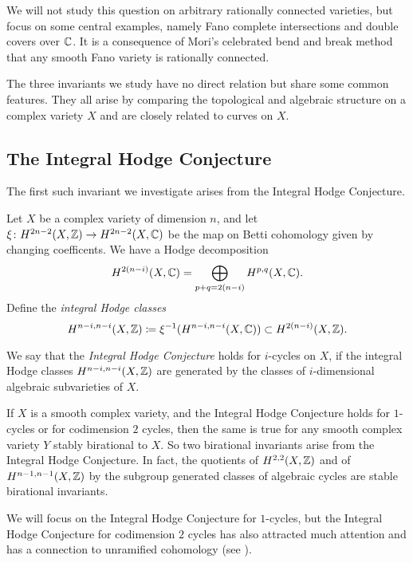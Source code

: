 We will not study this question on arbitrary rationally connected varieties, but focus on some central examples, namely Fano complete intersections and double covers over $\mathbb{C}$. It is a consequence of Mori's celebrated bend and break method that any smooth Fano variety is rationally connected.

The three invariants we study have no direct relation but share some common features. They all arise by comparing the topological and algebraic structure on a complex variety $X$ and are closely related to curves on $X$.

\subsection{The Integral Hodge Conjecture}
The first such invariant we investigate arises from the Integral Hodge Conjecture.

\begin{definition}
	\label{def:ZInvariant}
	Let $X$ be a complex variety of dimension $n$, and let $\xi \colon H^{2n-2}(X,\mathbb{Z}) \to H^{2n-2}(X,\mathbb{C})$ be the map on Betti cohomology given by changing coefficents. We have a Hodge decomposition 
	\[H^{2(n-i)}(X,\mathbb{C}) = \bigoplus_{p+q=2(n-i)}H^{p,q}(X,\mathbb{C}).\]
	Define the \emph{integral Hodge classes} 
	\[H^{n-i,n-i}(X,\mathbb{Z}) \coloneqq \xi^{-1}(H^{n-i,n-i}(X,\mathbb{C})) \subset H^{2(n-i)}(X,\mathbb{Z}).\]
\end{definition}
\begin{definition}
	We say that the \emph{Integral Hodge Conjecture} holds for $i$-cycles on $X$, if the integral Hodge classes $H^{n-i,n-i}(X,\mathbb{Z})$ are generated by the classes of $i$-dimensional algebraic subvarieties of $X$.
\end{definition}

If $X$ is a smooth complex variety, and the Integral Hodge Conjecture holds for $1$-cycles or for codimension $2$ cycles, then the same is true for any smooth complex variety $Y$ stably birational to $X$. So two birational invariants arise from the Integral Hodge Conjecture. In fact, the quotients of $H^{2,2}(X,\mathbb{Z})$ and of $H^{n-1,n-1}(X,\mathbb{Z})$ by the subgroup generated classes of algebraic cycles are stable birational invariants.

We will focus on the Integral Hodge Conjecture for $1$-cycles, but the Integral Hodge Conjecture for codimension $2$ cycles has also attracted much attention and has a connection to unramified cohomology (see \cite{ColliotTheleneVoisinIntegralHodge}).

